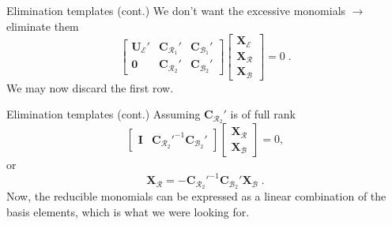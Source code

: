 \documentclass[aspectratio=169]{beamer}
\newcommand{\mat}[1]{\bm{#1}}
\newcommand{\CRk}[1]{\ensuremath{\mat{C}_{\mathcal{R}_{#1}}}}
\newcommand{\CBk}[1]{\ensuremath{\mat{C}_{\mathcal{B}_{#1}}}}
\newcommand{\XE}{\ensuremath{\mat{X}_\mathcal{E}}}
\newcommand{\XR}{\ensuremath{\mat{X}_\mathcal{R}}}
\newcommand{\XB}{\ensuremath{\mat{X}_\mathcal{B}}}
\begin{document}
\begin{frame}{Elimination templates (cont.)}
We don't want the excessive monomials $\longrightarrow$ eliminate them
\begin{equation*}
    \begin{bmatrix}
        \mat{U}_\mathcal{E}' &
        \CRk{1}' &
        \CBk{1}' \\
        \mat{0} &
        \CRk{2}' &
        \CBk{2}'
    \end{bmatrix}
    \begin{bmatrix}
        \XE \\
        \XR \\
        \XB
    \end{bmatrix}
    = 0\;.
\end{equation*}
We may now discard the first row.
\end{frame}

\begin{frame}{Elimination templates (cont.)}
Assuming $\CRk{2}'$ is of full rank
\begin{equation*}
    \begin{bmatrix}
        \mat{I} &
        \CRk{2}'^{-1}\CBk{2}'
    \end{bmatrix}
    \begin{bmatrix}
        \XR \\
        \XB
    \end{bmatrix}
    = 0,
\end{equation*}
or
\begin{equation*}
    \XR = -\CRk{2}'^{-1}\CBk{2}'\XB\;.
\end{equation*}
Now, the reducible monomials can be expressed as a linear combination of the basis elements,
which is what we were looking for.
\end{frame}
\end{document}
